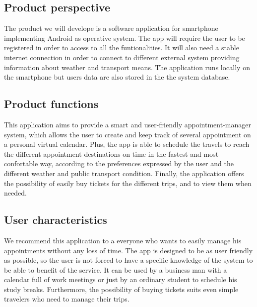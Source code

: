\subsection{Product perspective} 
The product we will develope is a software application  for smartphone implementing Android as operative system. The app will require the user to be registered in order to access to all the funtionalities. It will also need a stable internet connection in order to connect to different external system providing information about weather and transport means. The application runs locally on the smartphone but users data are also stored in the the system database.

\begin{figure}[!h]
	\centering
\end{figure}

\subsection{Product functions}
This application aims to provide a smart and user-friendly appointment-manager system, which allows the user to create and keep track of several appointment on a personal virtual calendar. Plus, the app is able to schedule the travels to reach the different appointment destinations on time in the fastest and most confortable way, according to the preferences expressed by the user and the different weather and public transport condition. Finally, the application offers the possibility of easily buy tickets for the different trips, and to view them when needed.
\subsection{User characteristics}
We recommend this application to a everyone who wants to easily manage his appointments without any loss of time. The app is designed to be as user friendly as possible, so the user is not forced to have a specific knowledge of the system to be able to benefit of the service. It can be used by a business man with a calendar full of work meetings or just by an ordinary student to schedule his study breaks. Furthermore, the possibility of buying tickets suits even simple travelers who need to manage their trips.
